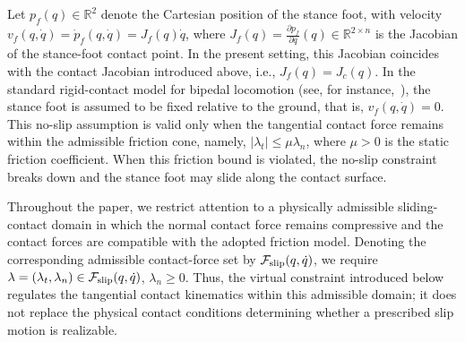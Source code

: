 \documentclass[letterpaper, 10 pt, conference]{ieeeconf}
\newcommand{\ara}[1]{\textcolor{purple}{(ARA: #1)}}
\begin{document}


Let $p_f(q) \in \mathbb{R}^2$ denote the Cartesian position of the stance foot, with velocity $v_f(q,\dot q)=\dot p_f(q,\dot q)=J_f(q)\dot q$,
where $J_f(q)=\frac{\partial p_f}{\partial q}(q)\in\mathbb R^{2\times n}$ is the Jacobian of the stance-foot contact point. In the present setting, this Jacobian coincides with the contact Jacobian introduced above, i.e., $J_f(q)=J_c(q)$. In the standard rigid-contact model for bipedal locomotion (see, for instance,~\cite[Eq. (3.19)]{Westervelt2007}), the stance foot is assumed to be fixed relative to the ground, that is, $v_f(q,\dot q)=0$. This no-slip assumption is valid only when the tangential contact force remains within the admissible friction cone, namely, $|\lambda_t|\leq \mu \lambda_n$, where $\mu>0$ is the static friction coefficient. When this friction bound is violated, the no-slip constraint breaks down and the stance foot may slide along the contact surface.

Throughout the paper, we restrict attention to a physically admissible
sliding-contact domain in which the normal contact force remains
compressive and the contact forces are compatible with the adopted
friction model. Denoting the corresponding admissible contact-force set
by $\mathcal{F}_{\rm slip}(q,\dot q)$, we require $\lambda=(\lambda_t,\lambda_n)\in
    \mathcal{F}_{\rm slip}(q,\dot q)$, $\lambda_n\geq 0$. Thus, the virtual constraint introduced below regulates the tangential
contact kinematics within this admissible domain; it does not replace
the physical contact conditions determining whether a prescribed slip
motion is realizable.
\end{document}
